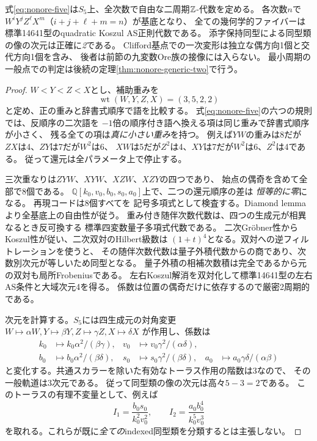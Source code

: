 \begin{theorem}[全五変数で正則な境界チャート]\label{thm:nonore-five}
式\eqref{eq:nonore-five}は$S_5$上、全次数で自由な二周期$\mathbb Z$-代数を定める。
各次数$n$で$W^iY^jZ^\ell X^m$（$i+j+\ell+m=n$）が基底となり、
全ての幾何学的ファイバーは標準14641型のquadratic Koszul AS正則代数である。
添字保持同型による同型類の像の次元は正確に\emph{2}である。
Clifford基点での一次変形は独立な偶方向1個と交代方向1個を含み、
後者は前節の九変数Ore族の接像には入らない。
最小周期の一般点での判定は後続の定理\ref{thm:nonore-generic-two}で行う。
\end{theorem}
\begin{proof}
$W<Y<Z<X$とし、補助重みを
\[
 \operatorname{wt}(W,Y,Z,X)=(3,5,2,2)
\]
と定め、正の重みと辞書式順序で語を比較する。
式\eqref{eq:nonore-five}の六つの規則では、反順序の二次語を
$-1$倍の順序付き語へ換える項は同じ重みで辞書式順序が小さく、
残る全ての項は\emph{真に小さい重み}を持つ。
例えば$YW$の重みは8だが$ZX$は4、$ZY$は7だが$W^2$は6、
$XW$は5だが$Z^2$は4、$XY$は7だが$W^2$は6、$Z^2$は4である。
従って還元は全パラメータ上で停止する。

三次重なりは$ZYW$、$XYW$、$XZW$、$XZY$の四つであり、
始点の偶奇を含めて全部で8個である。
$\mathbb Q[k_0,v_0,b_0,s_0,a_0]$上で、二つの還元順序の差は
\emph{恒等的に零}になる。
再現コードは8個すべてを
記号多項式として検査する。Diamond lemmaより全基底上の自由性が従う。
重み付き随伴次数代数は、四つの生成元が相異なるとき反可換する
標準四変数量子多項式代数である。
二次Gr\"obner性からKoszul性が従い、二次双対のHilbert級数は
$(1+t)^4$となる。双対への逆フィルトレーションを使うと、
その随伴次数代数は量子外積代数からの商であり、次数別次元が等しいため同型となる。
量子外積の相補次数積は完全であるから元の双対も局所Frobeniusである。
左右Koszul解消を双対化して標準14641型の左右AS条件と大域次元4を得る。
係数は位置の偶奇だけに依存するので厳密2周期的である。

次元を計算する。$S_5$には四生成元の対角変更
$W\mapsto\alpha W,Y\mapsto\beta Y,Z\mapsto\gamma Z,X\mapsto\delta X$
が作用し、係数は
\[
 \begin{aligned}
 k_0&\mapsto k_0\alpha^2/(\beta\gamma),&
 v_0&\mapsto v_0\gamma^2/(\alpha\delta),\\
 b_0&\mapsto b_0\alpha^2/(\beta\delta),&
 s_0&\mapsto s_0\gamma^2/(\beta\delta),&
 a_0&\mapsto a_0\gamma\delta/(\alpha\beta)
 \end{aligned}
\]
と変化する。共通スカラーを除いた有効なトーラス作用の階数は3なので、
その一般軌道は3次元である。
従って同型類の像の次元は高々$5-3=2$である。
このトーラスの有理不変量として、例えば
\[
 I_1=\frac{b_0s_0}{k_0^2v_0^2},\qquad
 I_2=\frac{a_0b_0^4}{k_0^5v_0^3}
\]
を取れる。これらが既に\emph{全ての}indexed同型類を分類するとは主張しない。


\end{proof}
